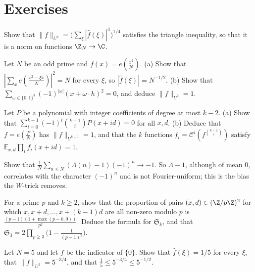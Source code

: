 \section{Exercises}

\begin{exercise}[$\star$]\label{ex:u2fourier}
Show that $\|f\|_{U^2}=\bigl(\sum_\xi|\hat f(\xi)|^4\bigr)^{1/4}$ satisfies the triangle inequality, so that it is a norm on functions $\Z_N\to\C$.
\end{exercise}

\begin{exercise}[$\star\star$]\label{ex:quadratic}
Let $N$ be an odd prime and $f(x)=e(\frac{x^2}N)$.
(a) Show that $|\sum_xe(\frac{x^2-\xi x}N)|^2=N$ for every $\xi$, so $|\hat f(\xi)|=N^{-1/2}$.
(b) Show that $\sum_{\omega\in\{0,1\}^3}(-1)^{|\omega|}(x+\omega\cdot h)^2=0$, and deduce $\|f\|_{U^3}=1$.
\end{exercise}

\begin{exercise}[$\star\star$]\label{ex:polyphase}
Let $P$ be a polynomial with integer coefficients of degree at most $k-2$.
(a) Show that $\sum_{i=0}^{k-1}(-1)^i\binom{k-1}iP(x+id)=0$ for all $x,d$.
(b) Deduce that $f=e(\frac PN)$ has $\|f\|_{U^{k-1}}=1$, and that the $k$ functions $f_i=\mathcal C^i(f^{\binom{k-1}i})$ satisfy $\mathbb E_{x,d}\prod_if_i(x+id)=1$.
\end{exercise}

\begin{exercise}[$\star\star$]\label{ex:lambdaparity}
Show that $\frac1N\sum_{n\le N}(\Lambda(n)-1)(-1)^n\to-1$. So $\Lambda-1$, although of mean $0$, correlates with the character $(-1)^n$ and is not Fourier-uniform; this is the bias the $W$-trick removes.
\end{exercise}

\begin{exercise}[$\star\star$]\label{ex:singular}
For a prime $p$ and $k\ge2$, show that the proportion of pairs $(x,d)\in(\Z/p\Z)^2$ for which $x,x+d,\dots,x+(k-1)d$ are all non-zero modulo $p$ is $\frac{(p-1)(1+\max(p-k,0))}{p^2}$. Deduce the formula for $\mathfrak S_k$, and that $\mathfrak S_3=2\prod_{p\ge3}\bigl(1-\frac1{(p-1)^2}\bigr)$.
\end{exercise}

\begin{exercise}[$\star$]\label{ex:v14-extra-13-1}
Let $N=5$ and let $f$ be the indicator of $\{0\}$. Show that $\hat f(\xi)=1/5$ for every $\xi$, that $\|f\|_{U^2}=5^{-3/4}$, and that $\frac15\le5^{-3/4}\le5^{-1/2}$.
\end{exercise}

